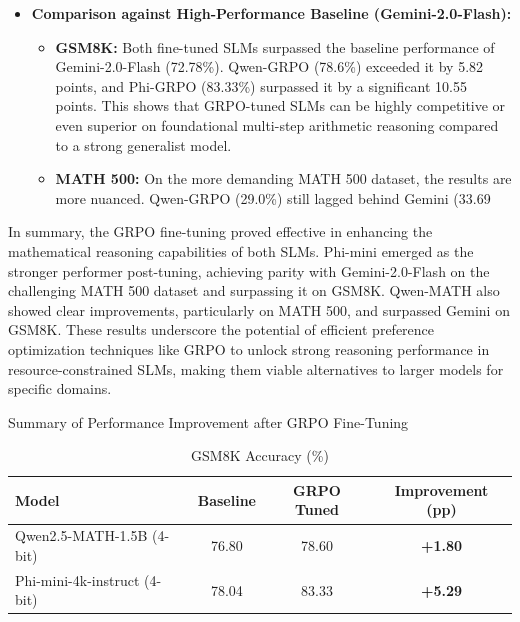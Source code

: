 \documentclass[11pt]{article}
\begin{document}
\begin{itemize}
\begin{itemize}
    \item \textbf{Comparison against High-Performance Baseline (Gemini-2.0-Flash):}
        \begin{itemize}
            \item \textbf{GSM8K:} Both fine-tuned SLMs surpassed the baseline performance of Gemini-2.0-Flash (72.78\%). Qwen-GRPO (78.6\%) exceeded it by 5.82 points, and Phi-GRPO (83.33\%) surpassed it by a significant 10.55 points. This shows that GRPO-tuned SLMs can be highly competitive or even superior on foundational multi-step arithmetic reasoning compared to a strong generalist model.
            \item \textbf{MATH 500:} On the more demanding MATH 500 dataset, the results are more nuanced. Qwen-GRPO (29.0\%) still lagged behind Gemini (33.69%
        \end{itemize}
\end{itemize}

In summary, the GRPO fine-tuning proved effective in enhancing the mathematical reasoning capabilities of both SLMs. Phi-mini emerged as the stronger performer post-tuning, achieving parity with Gemini-2.0-Flash on the challenging MATH 500 dataset and surpassing it on GSM8K. Qwen-MATH also showed clear improvements, particularly on MATH 500, and surpassed Gemini on GSM8K. These results underscore the potential of efficient preference optimization techniques like GRPO to unlock strong reasoning performance in resource-constrained SLMs, making them viable alternatives to larger models for specific domains.



\begin{table}[htbp]
    \centering
    \caption{Summary of Performance Improvement after GRPO Fine-Tuning}
    \label{tab:summary_comparison}
    
    \begin{subtable}{\linewidth}
    \centering
    \caption{GSM8K Accuracy (\%)}
    \begin{tabular}{@{}l
                    S[table-format=2.2]
                    S[table-format=2.2]
                    S[table-format=2.2, color=improvementgreen, detect-weight]
                    @{}}
    \toprule
    \textbf{Model} & {Baseline} & {GRPO Tuned} & {Improvement (pp)} \\
    \midrule
    Qwen2.5-MATH-1.5B (4-bit)     & 76.80 & 78.60 & \bfseries +1.80 \\
    Phi-mini-4k-instruct (4-bit)  & 78.04 & 83.33 & \bfseries +5.29 \\
    \bottomrule
    \end{tabular}
    \end{subtable}
    

\end{table}
\end{itemize}
\end{document}
